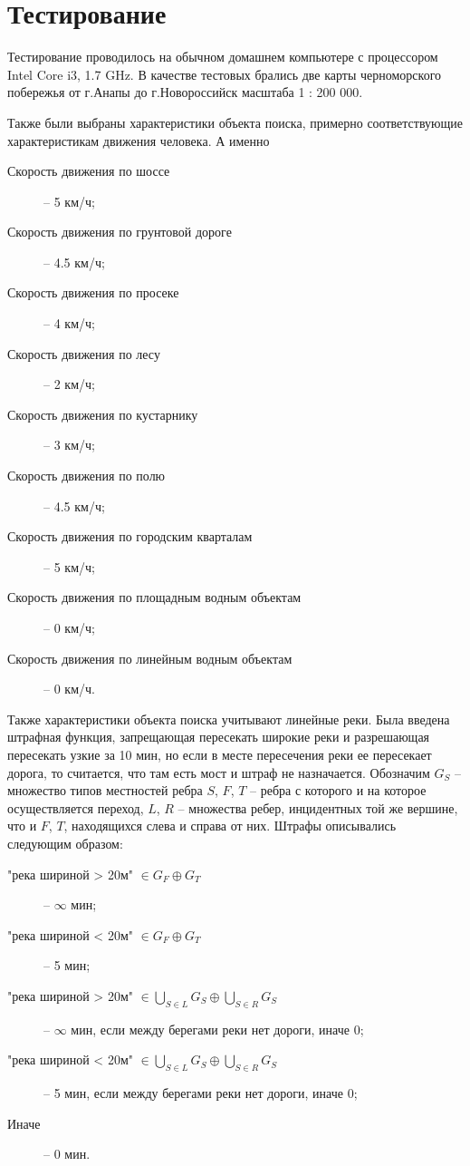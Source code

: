 \chapter{Тестирование}

Тестирование проводилось на обычном домашнем компьютере
с процессором Intel Core i3, 1.7 GHz. В качестве тестовых
брались две карты черноморского побережья от г.Анапы до г.Новороссийск
масштаба 1 : 200 000.

Также были выбраны характеристики объекта поиска, примерно соответствующие
характеристикам движения человека. А именно
\begin{description}
\item[Скорость движения по шоссе] -- 5 км/ч;
\item[Скорость движения по грунтовой дороге] -- 4.5 км/ч;
\item[Скорость движения по просеке] -- 4 км/ч;
\item[Скорость движения по лесу] -- 2 км/ч;
\item[Скорость движения по кустарнику] -- 3 км/ч;
\item[Скорость движения по полю] -- 4.5 км/ч;
\item[Скорость движения по городским кварталам] -- 5 км/ч;
\item[Скорость движения по площадным водным объектам] -- 0 км/ч;
\item[Скорость движения по линейным водным объектам] -- 0 км/ч.
\end{description}

Также характеристики объекта поиска учитывают линейные реки.
Была введена штрафная функция, запрещающая пересекать широкие
реки и разрешающая пересекать узкие за 10 мин, но если в
месте пересечения реки ее пересекает дорога, то считается, что
там есть мост и штраф не назначается. Обозначим
$G_S$ -- множество типов местностей ребра $S$, $F$, $T$ --
ребра с которого и на которое осуществляется переход,
$L$, $R$ -- множества ребер, инцидентных той же вершине, что и
$F$, $T$, находящихся слева и справа от них.
Штрафы описывались следующим образом:
\begin{description}
\item["река шириной > 20м" $\in G_F \oplus G_T$] -- $\infty$ мин;
\item["река шириной < 20м" $\in G_F \oplus G_T$] -- 5 мин;
\item["река шириной > 20м" $\displaystyle\in \bigcup_{S\in L}G_S \oplus \bigcup_{S\in R}G_S$]
-- $\infty$ мин, если между берегами реки нет дороги, иначе 0;
\item["река шириной < 20м" $\displaystyle\in \bigcup_{S\in L}G_S \oplus \bigcup_{S\in R}G_S$]
-- 5 мин, если между берегами реки нет дороги, иначе 0;
\item[Иначе] -- 0 мин.
\end{description}

